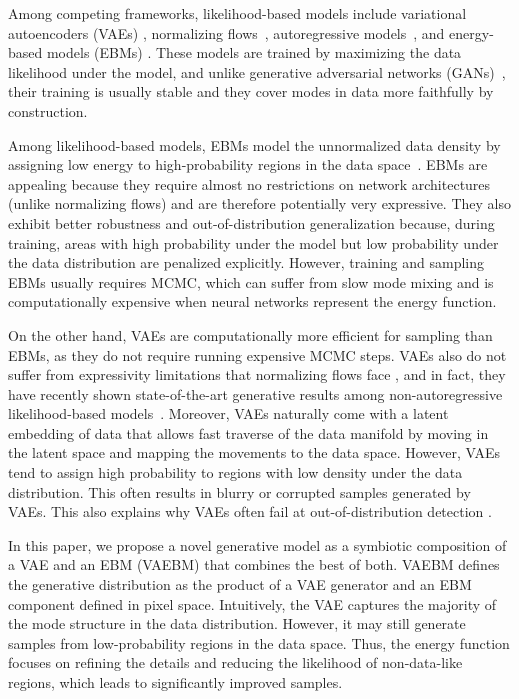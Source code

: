 \documentclass{article} \usepackage{iclr2021_conference,times}
\begin{document}
Among competing frameworks, likelihood-based models include variational autoencoders (VAEs) \citep{kingma2014vae, rezende2014stochastic}, normalizing flows~\citep{rezendeICML15Normalizing, dinh2016density}, autoregressive models~\citep{oord2016pixel}, and energy-based models (EBMs) \citep{928a56b7d6f1473e930f282a0c4b534e,RBM}. These models are trained by maximizing the data likelihood under the model, and unlike generative adversarial networks (GANs)~\citep{NIPS2014_5423}, their training is usually stable and they cover modes in data more faithfully by construction. 







Among likelihood-based models, EBMs model the unnormalized data density by assigning low energy to high-probability regions in the data space~\citep{xie2016theory,du2019implicit}. EBMs are appealing because they require almost no restrictions on network architectures (unlike normalizing flows) and are therefore potentially very expressive.
They also exhibit better robustness and out-of-distribution generalization \citep{du2019implicit} because, during training, areas with high probability under the model but low probability under the data distribution are penalized explicitly. However, training and sampling EBMs usually requires MCMC, which can suffer from slow mode mixing and is computationally expensive when neural networks represent the energy function. 

On the other hand, VAEs are computationally more efficient for sampling than EBMs, as they do not require running expensive MCMC steps. VAEs also do not suffer from expressivity limitations that normalizing flows face \citep{dupont2019augmented, kong2020expressive}, and in fact, they have recently shown state-of-the-art generative results among non-autoregressive likelihood-based models~\citep{vahdat2020nvae}. Moreover, VAEs naturally come with a latent embedding of data that allows fast traverse of the data manifold by moving in the latent space and mapping the movements to the data space. However, VAEs tend to assign high probability to regions with low density under the data distribution. This often results in blurry or corrupted samples generated by VAEs. This also explains why VAEs often fail at out-of-distribution detection \citep{nalisnick2018deep}. 




In this paper, we propose a novel generative model as a symbiotic composition of a VAE and an EBM (VAEBM) that combines the best of both. VAEBM defines the generative distribution as the product of a VAE generator and an EBM component defined in pixel space. Intuitively, the VAE captures the majority of the mode structure in the data distribution. However, it may still generate samples from low-probability regions in the data space. Thus, the energy function focuses on refining the details and reducing the likelihood of non-data-like regions, which leads to significantly improved samples.
\end{document}

